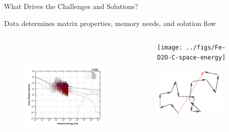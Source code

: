 \documentclass[xcolor=x11names,compress]{beamer}
\renewcommand{\(}{\begin{columns}}
\renewcommand{\)}{\end{columns}}
\newcommand{\<}[1]{\begin{column}{#1}}
\renewcommand{\>}{\end{column}}
\begin{document}
\begin{frame}{What Drives the Challenges and Solutions?}
    	
    	\alert{Data} determines matrix properties, memory needs, and solution flow
    	
    \begin{columns}
    \begin{column}{0.55\textwidth}     
 	   \begin{center}
 	   \begin{figure}
 	   \includegraphics[height=2.25in,clip]{../figs/u235-xsecs}
       \end{figure}
 	   \end{center}
  	\end{column}
 	\begin{column}{0.4\textwidth}
 	   \begin{center}
 	   \begin{figure}     
 	   \texttt{[image: ../figs/Fe-D2O-C-space-energy]}
 	   \end{figure}
 	   \begin{figure} 
 	   \includegraphics[height=1in,clip]{../figs/random-walk}
       \end{figure}
 	   \end{center}
  	\end{column}
	\end{columns}
	
\end{frame}
\end{document}
